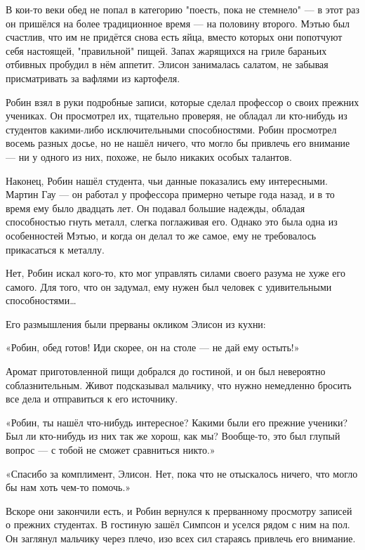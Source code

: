\documentclass[a4paper,12pt]{book}
\begin{document}
\par
В кои-то веки обед не попал в категорию "поесть, пока не стемнело" — в этот раз он пришёлся на более традиционное время — на половину второго. Мэтью был счастлив, что им не придётся снова есть яйца, вместо которых они попотчуют себя настоящей, "правильной" пищей. Запах жарящихся на гриле бараньих отбивных пробудил в нём аппетит. Элисон занималась салатом, не забывая присматривать за вафлями из картофеля.\\
\par
Робин взял в руки подробные записи, которые сделал профессор о своих прежних учениках. Он просмотрел их, тщательно проверяя, не обладал ли кто-нибудь из студентов какими-либо исключительными способностями. Робин просмотрел восемь разных досье, но не нашёл ничего, что могло бы привлечь его внимание — ни у одного из них, похоже, не было никаких особых талантов.
\par
Наконец, Робин нашёл студента, чьи данные показались ему интересными. Мартин Гау — он работал у профессора примерно четыре года назад, и в то время ему было двадцать лет. Он подавал большие надежды, обладая способностью гнуть металл, слегка поглаживая его. Однако это была одна из особенностей Мэтью, и когда он делал то же самое, ему не требовалось прикасаться к металлу.
\par
Нет, Робин искал кого-то, кто мог управлять силами своего разума не хуже его самого. Для того, что он задумал, ему нужен был человек с удивительными способностями…
\par
Его размышления были прерваны окликом Элисон из кухни:
\par
«Робин, обед готов! Иди скорее, он на столе — не дай ему остыть!»
\par
Аромат приготовленной пищи добрался до гостиной, и он был невероятно соблазнительным. Живот подсказывал мальчику, что нужно немедленно бросить все дела и отправиться к его источнику.\\
\par
«Робин, ты нашёл что-нибудь интересное? Какими были его прежние ученики? Был ли кто-нибудь из них так же хорош, как мы? Вообще-то, это был глупый вопрос — с тобой не сможет сравниться никто.»
\par
«Спасибо за комплимент, Элисон. Нет, пока что не отыскалось ничего, что могло бы нам хоть чем-то помочь.»\\
\par
Вскоре они закончили есть, и Робин вернулся к прерванному просмотру записей о прежних студентах. В гостиную зашёл Симпсон и уселся рядом с ним на пол. Он заглянул мальчику через плечо, изо всех сил стараясь привлечь его внимание.
\end{document}
